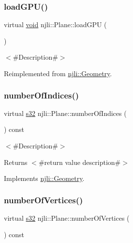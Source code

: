 \subsubsection{\texorpdfstring{load\+G\+P\+U()}{loadGPU()}}
{\footnotesize\ttfamily virtual \mbox{\hyperlink{_thread_8h_af1e856da2e658414cb2456cb6f7ebc66}{void}} njli\+::\+Plane\+::load\+G\+PU (\begin{DoxyParamCaption}{ }\end{DoxyParamCaption})\hspace{0.3cm}{\ttfamily [virtual]}}

$<$\#\+Description\#$>$ 

Reimplemented from \mbox{\hyperlink{classnjli_1_1_geometry_a3242e657cbb5914f8f29ba6dbe21ef89}{njli\+::\+Geometry}}.

\mbox{\label{classnjli_1_1_plane_a4dd558b3278ca76bfd21d2ec9f02b87b}} 
\subsubsection{\texorpdfstring{number\+Of\+Indices()}{numberOfIndices()}}
{\footnotesize\ttfamily virtual \mbox{\hyperlink{_util_8h_aa62c75d314a0d1f37f79c4b73b2292e2}{s32}} njli\+::\+Plane\+::number\+Of\+Indices (\begin{DoxyParamCaption}{ }\end{DoxyParamCaption}) const\hspace{0.3cm}{\ttfamily [virtual]}}

$<$\#\+Description\#$>$

\begin{DoxyReturn}{Returns}
$<$\#return value description\#$>$ 
\end{DoxyReturn}


Implements \mbox{\hyperlink{classnjli_1_1_geometry_a1033c9f6dee9f725b122c2ddd33f4b0e}{njli\+::\+Geometry}}.

\mbox{\label{classnjli_1_1_plane_a5e69f210a364b0fbacb0e06d98e41725}} 
\subsubsection{\texorpdfstring{number\+Of\+Vertices()}{numberOfVertices()}}
{\footnotesize\ttfamily virtual \mbox{\hyperlink{_util_8h_aa62c75d314a0d1f37f79c4b73b2292e2}{s32}} njli\+::\+Plane\+::number\+Of\+Vertices (\begin{DoxyParamCaption}{ }\end{DoxyParamCaption}) const\hspace{0.3cm}{\ttfamily [virtual]}}

